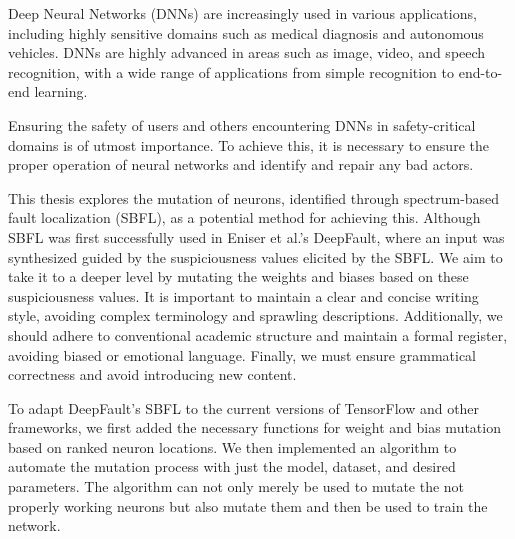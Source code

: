 Deep Neural Networks (DNNs)\cite{lecun_deep_2015} are increasingly used in various applications, including highly sensitive domains such as medical diagnosis\cite{litjens_survey_2017} and autonomous vehicles\cite{bojarski_end_2016}.
DNNs are highly advanced in areas such as image\cite{krizhevsky_imagenet_2012,litjens_survey_2017,ciresan_multi-column_2012}, video\cite{jiang_exploiting_2018}, and speech recognition\cite{hinton_deep_2012}, with a wide range of applications from simple recognition to end-to-end learning\cite{bojarski_end_2016}.

Ensuring the safety of users and others encountering DNNs in safety-critical domains is of utmost importance.
To achieve this, it is necessary to ensure the proper operation of neural networks and identify and repair any bad actors.

This thesis explores the mutation of neurons, identified through spectrum-based fault localization (SBFL), as a potential method for achieving this.
Although SBFL was first successfully used in Eniser et al.'s DeepFault\cite{eniser_deepfault_2019}, where an input was synthesized guided by the suspiciousness values elicited by the SBFL. We aim to take it to a deeper level by mutating the weights and biases based on these suspiciousness values.
It is important to maintain a clear and concise writing style, avoiding complex terminology and sprawling descriptions.
Additionally, we should adhere to conventional academic structure and maintain a formal register, avoiding biased or emotional language.
Finally, we must ensure grammatical correctness and avoid introducing new content.

To adapt DeepFault's SBFL to the current versions of TensorFlow and other frameworks, we first added the necessary functions for weight and bias mutation based on ranked neuron locations.
We then implemented an algorithm to automate the mutation process with just the model, dataset, and desired parameters.
The algorithm can not only merely be used to mutate the not properly working neurons but also mutate them and then be used to train the network.